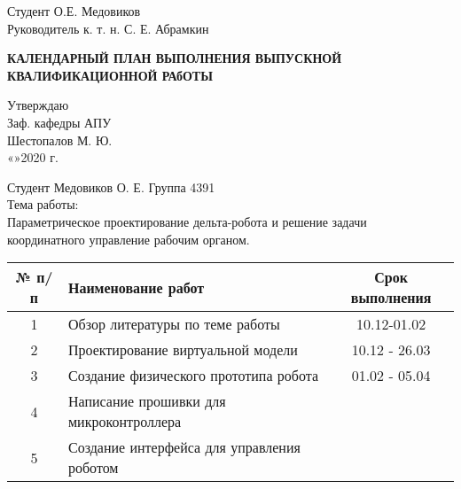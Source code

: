 \begin{flushleft}
 \hspace{1cm} Студент \hspace{7cm} \underline{\hspace{3cm}}  О.Е. Медовиков \\ 
 \vspace{5mm}
 \hspace{1cm} Руководитель \hspace{2cm} к. т. н. \hspace{2cm} \underline{\hspace{3cm}}  С. Е. Абрамкин\\ 
\end{flushleft}

\thispagestyle{empty} %

\newpage
\begin{center}
\large{\textbf{КАЛЕНДАРНЫЙ ПЛАН ВЫПОЛНЕНИЯ ВЫПУСКНОЙ КВАЛИФИКАЦИОННОЙ РАбОТЫ}}\\
\end{center}
\begin{flushright}
Утверждаю\\
Заф. кафедры АПУ\\
\underline{\hspace{3cm}} Шестопалов М. Ю.\\
«\underline{\hspace{0.7cm}}»\underline{\hspace{3cm}}2020 г.
\vspace{1cm}
\end{flushright}

\begin{flushleft}
Студент Медовиков О. Е. \hspace{7cm} Группа 4391\\
Тема работы:\\ Параметрическое проектирование дельта-робота и решение задачи\\ координатного управление рабочим органом.\\
\vspace{1cm}
\end{flushleft}


\begin{tabular}{| c | l | c | }
\hline
№ п/п & Наименование работ & Срок выполнения\\
\hline
1 & Обзор литературы по теме работы & 10.12-01.02\\ 
\hline
2 & Проектирование виртуальной модели& 10.12 - 26.03\\
\hline
3 & Создание физического прототипа робота & 01.02 - 05.04\\
\hline
4 & Написание прошивки для микроконтроллера & \\
\hline
5 & Создание интерфейса для управления роботом & \\
\hline
\end{tabular}

